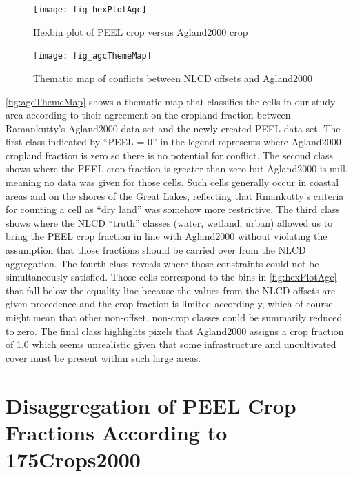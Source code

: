 \begin{figure}[hpt] 
  \centering

    \texttt{[image: fig\_hexPlotAgc]}
  \caption{Hexbin plot of PEEL crop versus Agland2000 crop}
  \label{fig:hexPlotAgc} 
\end{figure} 



\begin{figure} 
  \centering


    \texttt{[image: fig\_agcThemeMap]}
  \caption{Thematic map of conflicts between NLCD offsets and Agland2000}
  \label{fig:agcThemeMap} 
\end{figure} 


\autoref{fig:agcThemeMap} shows a thematic map that classifies the
cells in our study area according to their agreement on the cropland
fraction between Ramankutty's Agland2000 data set and the newly
created PEEL data set.  The first class indicated by ``PEEL = 0'' in
the legend represents where Agland2000 cropland fraction is zero so
there is no potential for conflict.  The second class shows where the
PEEL crop fraction is greater than zero but Agland2000 is null,
meaning no data was given for those cells.  Such cells generally occur
in coastal areas and on the shores of the Great Lakes, reflecting that
Rmankutty's criteria for counting a cell as ``dry land'' was somehow
more restrictive.  The third class shows where the NLCD ``truth''
classes (water, wetland, urban) allowed us to bring the PEEL crop
fraction in line with Agland2000 without violating the assumption that
those fractions should be carried over from the NLCD aggregation.  The
fourth class reveals where those constraints could not be
simultaneously satisfied.  Those cells correspond to the bins in
\autoref{fig:hexPlotAgc} that fall below the equality line because the
values from the NLCD offsets are given precedence and the crop
fraction is limited accordingly, which of course might mean that other
non-offset, non-crop classes could be summarily reduced to zero.  The
final class highlights pixels that Agland2000 assigns a crop fraction
of 1.0 which seems unrealistic given that some infrastructure and
uncultivated cover must be present within such large areas.

\section{Disaggregation of PEEL Crop Fractions According to 175Crops2000}
\label{sec:peel}





